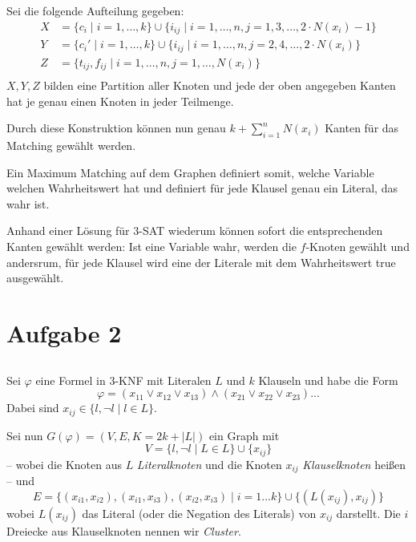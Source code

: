 \documentclass[a4paper]{article}
\begin{document}
Sei die folgende Aufteilung gegeben:
\begin{align*}
X &= \{ c_i \mid i = 1, \dots, k \} \cup \{ i_{ij} \mid i=1,\dots,n, j=1,3,\dots,2 \cdot N(x_i) - 1 \} \\
Y &= \{ c_i' \mid i = 1, \dots, k \} \cup \{ i_{ij} \mid i=1,\dots,n, j=2,4,\dots,2 \cdot N(x_i) \} \\
Z &= \{ t_{ij}, f_{ij} \mid i = 1,\dots,n, j = 1,\dots,N(x_i) \} \\
\end{align*}
$X,Y,Z$ bilden eine Partition aller Knoten und jede der oben angegeben
Kanten hat je genau einen Knoten in jeder Teilmenge.

Durch diese Konstruktion können nun genau $k + \sum_{i=1}^n N(x_i)$ Kanten
für das Matching gewählt werden.

Ein Maximum Matching auf dem Graphen definiert somit, welche Variable
welchen Wahrheitswert hat und definiert für jede Klausel genau ein Literal,
das wahr ist.

Anhand einer Lösung für 3-SAT wiederum können sofort die entsprechenden
Kanten gewählt werden: Ist eine Variable wahr, werden die $f$-Knoten gewählt
und andersrum, für jede Klausel wird eine der Literale mit dem Wahrheitswert
true ausgewählt.

\subsection{}

\section{Aufgabe 2}
\subsection{}
Sei $\varphi$ eine Formel in 3-KNF mit Literalen $L$ und $k$ Klauseln und habe die Form
\[ \varphi = (x_{11} \vee x_{12} \vee x_{13}) \wedge (x_{21} \vee x_{22} \vee x_{23}) ... \]
Dabei sind $x_{ij} \in \{ l, \neg l \mid l \in L \}$.

Sei nun $G(\varphi) = (V, E, K = 2 k + |L|)$ ein Graph mit 
\[ V = \{ l, \neg l \mid L \in L \} \cup \{ x_{ij} \} \]
-- wobei die Knoten aus $L$ \emph{Literalknoten} und die Knoten $x_{ij}$ \emph{Klauselknoten} heißen --
und
\[ E = \{ (x_{i1},x_{i2}), (x_{i1},x_{i3}), (x_{i2},x_{i3}) \mid i = 1 ... k \} \cup \{ (L(x_{ij}),x_{ij}) \} \]
wobei $L(x_{ij})$ das Literal (oder die Negation des Literals) von $x_{ij}$ darstellt.
Die $i$ Dreiecke aus Klauselknoten nennen wir \emph{Cluster}.
\end{document}
